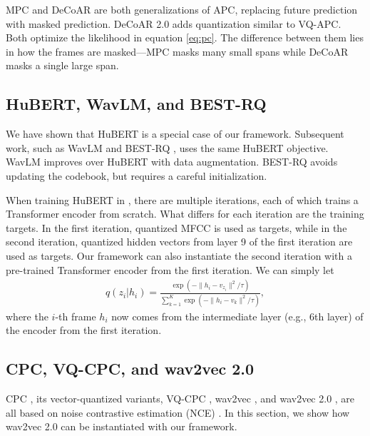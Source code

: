 MPC \citep{jiang2019improving,zhang2021transformer} and DeCoAR \citep{9053176} are both generalizations of APC,
replacing future prediction with masked prediction.
DeCoAR 2.0 \citep{ling2020decoar} adds quantization similar to VQ-APC.
Both optimize the likelihood in equation \ref{eq:pc}.
The difference between them lies in how the frames are masked---MPC masks many small spans while DeCoAR masks a single large span.

\subsection{HuBERT, WavLM, and BEST-RQ}
\label{sec:hubert-variants}

We have shown that HuBERT is a special case of our framework.
%
%
Subsequent work, such as WavLM \citep{chen2022wavlm} and BEST-RQ \citep{chiu2022self}, uses the same HuBERT objective.
WavLM improves over HuBERT with data augmentation.
BEST-RQ avoids updating the codebook, but requires a careful initialization.

When training HuBERT in \citet{hsu2021hubert}, there are multiple iterations, each of which trains a Transformer encoder from scratch.
What differs for each iteration are the training targets.
In the first iteration, quantized MFCC is used as targets, while in the second iteration, quantized hidden vectors from layer 9 of the first iteration are used as targets.
Our framework can also instantiate the second iteration with a pre-trained Transformer encoder from the first iteration. 
We can simply let
\begin{align}
    q(z_i|h_i) = \frac{\exp\left(-\|h_i - v_{z_i}\|^2 / \tau\right)} 
  {\sum_{k=1}^{K} \exp\left(-\|h_i - v_k\|^2 / \tau\right)},
\label{eq:softmax-q-iter2}
\end{align}
where the $i$-th frame $h_i$ now comes from the intermediate layer (e.g., 6th layer) of
the encoder from the first iteration.

\subsection{CPC, VQ-CPC, and wav2vec 2.0}
\label{sec:wav2vec}

%
%
%
%
%
%
CPC \citep{oord2018representation}, its vector-quantized variants, VQ-CPC \citep{niekerk2020vector}, 
wav2vec \citep{schneider2019wav2vec}, and wav2vec 2.0 \citep{baevski2020wav2vec}, 
are all based on noise contrastive estimation (NCE) \citep{smith-eisner-2005-contrastive,pmlr-v9-gutmann10a}.
%
%
%
%
%
In this section, we show how wav2vec 2.0 can be instantiated with our framework.

